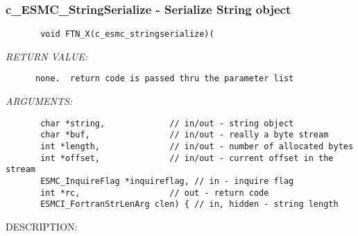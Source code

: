  
\setlength{\oldparskip}{\parskip}
\setlength{\parskip}{1.5ex}
\setlength{\oldparindent}{\parindent}
\setlength{\parindent}{0pt}
\setlength{\oldbaselineskip}{\baselineskip}
\setlength{\baselineskip}{11pt}
 
\def\bv{\begin{verbatim}}
\def\ev{\end{verbatim}}
\def\be{\begin{equation}}
\def\ee{\end{equation}}
\def\bea{\begin{eqnarray}}
\def\eea{\end{eqnarray}}
\def\bi{\begin{itemize}}
\def\ei{\end{itemize}}
\def\bn{\begin{enumerate}}
\def\en{\end{enumerate}}
\def\bd{\begin{description}}
\def\ed{\end{description}}
\def\({\left (}
\def\){\right )}
\def\[{\left [}
\def\]{\right ]}
\def\<{\left  \langle}
\def\>{\right \rangle}
\def\cI{{\cal I}}
\def\diag{\mathop{\rm diag}}
\def\tr{\mathop{\rm tr}}


 
\subsubsection [c\_ESMC\_StringSerialize] {c\_ESMC\_StringSerialize - Serialize String object}


  
\begin{verbatim}       void FTN_X(c_esmc_stringserialize)(\end{verbatim}{\em RETURN VALUE:}
\begin{verbatim}      none.  return code is passed thru the parameter list\end{verbatim}{\em ARGUMENTS:}
\begin{verbatim}       char *string,             // in/out - string object
       char *buf,                // in/out - really a byte stream
       int *length,              // in/out - number of allocated bytes
       int *offset,              // in/out - current offset in the stream
       ESMC_InquireFlag *inquireflag, // in - inquire flag
       int *rc,                  // out - return code
       ESMCI_FortranStrLenArg clen) { // in, hidden - string length\end{verbatim}
{\sf DESCRIPTION:\\ }


